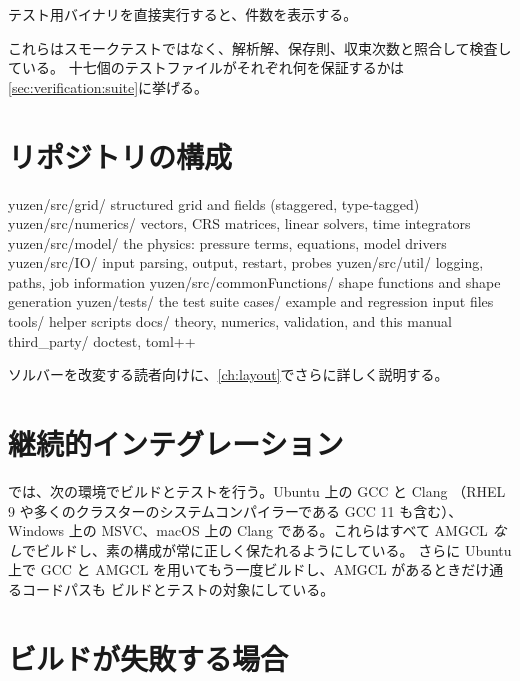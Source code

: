 テスト用バイナリを直接実行すると、件数を表示する。


これらはスモークテストではなく、解析解、保存則、収束次数と照合して検査している。
十七個のテストファイルがそれぞれ何を保証するかは\cref{sec:verification:suite}に挙げる。

\section{リポジトリの構成}
\label{sec:install:layout}

\begin{plain}
yuzen/src/grid/        structured grid and fields (staggered, type-tagged)
yuzen/src/numerics/    vectors, CRS matrices, linear solvers, time integrators
yuzen/src/model/       the physics: pressure terms, equations, model drivers
yuzen/src/IO/          input parsing, output, restart, probes
yuzen/src/util/        logging, paths, job information
yuzen/src/commonFunctions/   shape functions and shape generation
yuzen/tests/           the test suite
cases/                 example and regression input files
tools/                 helper scripts
docs/                  theory, numerics, validation, and this manual
third_party/           doctest, toml++
\end{plain}

ソルバーを改変する読者向けに、\cref{ch:layout}でさらに詳しく説明する。

\section{継続的インテグレーション}
\label{sec:install:ci}

では、次の環境でビルドとテストを行う。Ubuntu 上の GCC と Clang
（RHEL 9 や多くのクラスターのシステムコンパイラーである GCC 11 も含む）、Windows 上の MSVC、macOS 上の
Clang である。これらはすべて AMGCL \emph{なし}でビルドし、素の構成が常に正しく保たれるようにしている。
さらに Ubuntu 上で GCC と AMGCL を用いてもう一度ビルドし、AMGCL があるときだけ通るコードパスも
ビルドとテストの対象にしている。

\section{ビルドが失敗する場合}
\label{sec:install:trouble}

